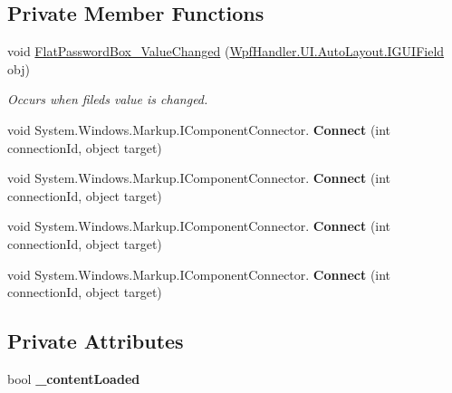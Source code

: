 \subsection*{Private Member Functions}
\begin{DoxyCompactItemize}
\item 
void \mbox{\hyperlink{class_text_filed_controls_1_1_main_window_affe40db766699f7b40c2a604cd581a60}{Flat\+Password\+Box\+\_\+\+Value\+Changed}} (\mbox{\hyperlink{interface_wpf_handler_1_1_u_i_1_1_auto_layout_1_1_i_g_u_i_field}{Wpf\+Handler.\+U\+I.\+Auto\+Layout.\+I\+G\+U\+I\+Field}} obj)
\begin{DoxyCompactList}\small\item\em Occurs when filed\textquotesingle{}s value is changed. \end{DoxyCompactList}\item 
\mbox{\label{class_text_filed_controls_1_1_main_window_a3aa31fdb3961e7a52ac125d3fe35dde4}} 
void System.\+Windows.\+Markup.\+I\+Component\+Connector. {\bfseries Connect} (int connection\+Id, object target)
\item 
\mbox{\label{class_text_filed_controls_1_1_main_window_a3aa31fdb3961e7a52ac125d3fe35dde4}} 
void System.\+Windows.\+Markup.\+I\+Component\+Connector. {\bfseries Connect} (int connection\+Id, object target)
\item 
\mbox{\label{class_text_filed_controls_1_1_main_window_a3aa31fdb3961e7a52ac125d3fe35dde4}} 
void System.\+Windows.\+Markup.\+I\+Component\+Connector. {\bfseries Connect} (int connection\+Id, object target)
\item 
\mbox{\label{class_text_filed_controls_1_1_main_window_a3aa31fdb3961e7a52ac125d3fe35dde4}} 
void System.\+Windows.\+Markup.\+I\+Component\+Connector. {\bfseries Connect} (int connection\+Id, object target)
\end{DoxyCompactItemize}
\subsection*{Private Attributes}
\begin{DoxyCompactItemize}
\item 
\mbox{\label{class_text_filed_controls_1_1_main_window_af4e4a1350de824cd9773fbb56d4128ad}} 
bool {\bfseries \+\_\+content\+Loaded}
\end{DoxyCompactItemize}


